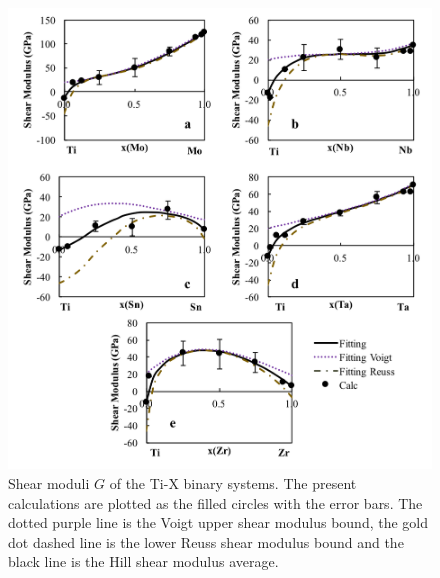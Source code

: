 \pagebreak
\begin{figure}[H]
	\centering
	\includegraphics[width=\textwidth]{Chapter-5/Figures/tixshear.png}
	\caption{Shear moduli $G$ of the Ti-X binary systems. The present calculations are plotted as the filled circles with the error bars. The dotted purple line is the Voigt upper shear modulus bound, the gold dot dashed line is the lower Reuss shear modulus bound and the black line is the Hill shear modulus average.}
	\label{Ch5-figure:tixshear}
\end{figure}

